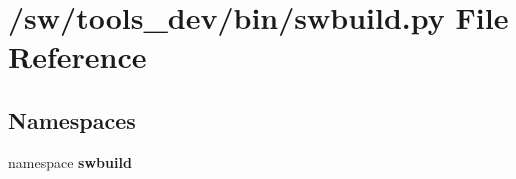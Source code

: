 \section{/sw/tools\_\-dev/bin/swbuild.py File Reference}
\label{swbuild_8py}
\subsection*{Namespaces}
\begin{CompactItemize}
\item 
namespace {\bf swbuild}
\end{CompactItemize}
